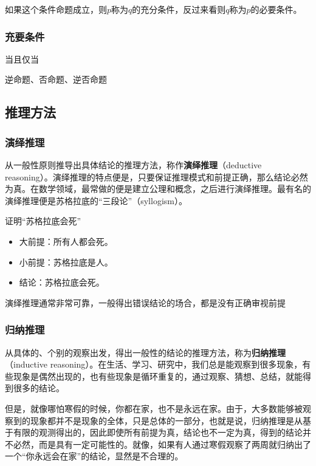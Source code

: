 如果这个条件命题成立，则$p$称为$q$的充分条件，反过来看则$q$称为$p$的必要条件。

\subsubsection{充要条件}

当且仅当

逆命题、否命题、逆否命题

\subsection{推理方法}

\subsubsection{演绎推理}

从一般性原则推导出具体结论的推理方法，称作\textbf{演绎推理}（deductive reasoning）。演绎推理的特点便是，只要保证推理模式和前提正确，那么结论必然为真。在数学领域，最常做的便是建立公理和概念，之后进行演绎推理。最有名的演绎推理便是苏格拉底的“三段论”（syllogism）。

\begin{example}{证明“苏格拉底会死”}
\begin{itemize}
\item 大前提：所有人都会死。
\item 小前提：苏格拉底是人。
\item 结论：苏格拉底会死。
\end{itemize}
\end{example}

演绎推理通常非常可靠，一般得出错误结论的场合，都是没有正确审视前提

\subsubsection{归纳推理}

从具体的、个别的观察出发，得出一般性的结论的推理方法，称为\textbf{归纳推理}（inductive reasoning）。在生活、学习、研究中，我们总是能观察到很多现象，有些现象是偶然出现的，也有些现象是循环重复的，通过观察、猜想、总结，就能得到很多的结论。

但是，就像哪怕寒假的时候，你都在家，也不是永远在家。由于，大多数能够被观察到的现象都并不是现象的全体，只是总体的一部分，也就是说，归纳推理是从基于有限的观测得出的，因此即使所有前提为真，结论也不一定为真，得到的结论并不必然，而是具有一定可能性的。就像，如果有人通过寒假观察了两周就归纳出了一个“你永远会在家”的结论，显然是不合理的。

